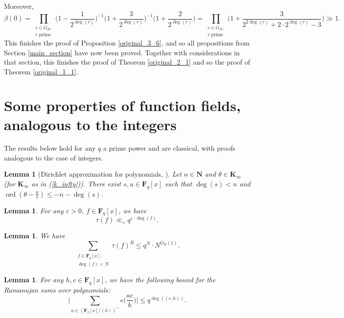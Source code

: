 \documentclass[11pt, reqno]{amsart}
\newtheorem{lemma}[theorem]{Lemma}
\numberwithin{equation}{section}
\newcommand{\zff}{\mathbf{F}_2[x]}
\newcommand{\zffmi}[1]{(\zff/(#1))^{\times}}
\newcommand\eps{\varepsilon}
\newcommand\ord{\operatorname{ord}}
\newcommand\pprime{\operatorname{prime}}
\begin{document}
Moreover, $$\beta(0)=\prod_{\substack{r \in G_R, \\ r \pprime}} \Big(1 - \frac{1}{2^{\deg(r)}}\Big)^{-1}\Big( 1 + \frac{3}{2^{\deg(r)}} \Big)^{-1} \Big( 1 + \frac{2}{2^{\deg(r)}} \Big)=\prod_{\substack{r \in G_R, \\ r \pprime}} \Big(1 + \frac{3}{2^{2\deg(r)} + 2 \cdot 2^{\deg(r)} - 3} \Big) \gg 1.$$
This finishes the proof of Proposition \ref{original_3_6}, and so all propositions from Section \ref{main_section} have now been proved. Together with considerations in that section, this finishes the proof of Theorem \ref{original_2_1} and so the proof of Theorem \ref{original_1_1}.

\appendix

\section{Some properties of function fields, analogous to the integers}
\label{section_appendix}

The results below hold for any $q$ a prime power and are classical, with proofs analogous to the case of integers.

\begin{lemma}[Dirichlet approximation for polynomials, \cite{dirichlet_polynomials}]
\label{dirichlet}
    Let $n \in \mathbf{N}$ and $\theta \in \mathbf{K}_{\infty}$ (for $\mathbf{K}_{\infty}$ as in (\ref{k_infty})). There exist $s, u \in \mathbf{F}_q[x]$ such that $\deg(s) < n$ and $\ord(\theta-\frac{u}{s}) \leqslant -n-\deg(s)$.
\end{lemma}

\begin{lemma}
\label{divisor_bound}
    For any $\eps>0$, $f \in \mathbf{F}_q[x]$, we have $$\tau(f) \ll_{\eps} q^{ \eps \cdot \deg(f)}.$$
\end{lemma}

\begin{lemma}
\label{original_A_1}
    We have $$\sum_{\substack{f \in \mathbf{F}_q[x]: \\ \deg(f) < N}} \tau(f)^B \leqslant q^N \cdot N^{O_B(1)}.$$
\end{lemma}

\begin{lemma}
\label{ramanujamsums}
    For any $h, c \in \mathbf{F}_q[x]$, we have the following bound for the Ramanujan sums over polynomials: $$\bigg| \sum_{a \in \zffmi{h}}e\Big( \frac{ac}{h} \Big) \bigg| \leqslant q^{\deg( (c, h) )}.$$
\end{lemma}
\end{document}
